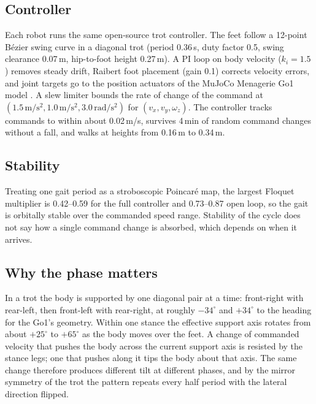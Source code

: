 \documentclass[pdflatex,sn-mathphys-num]{sn-jnl}
\begin{document}
\subsection{Controller}
Each robot runs the same open-source trot controller. The feet follow a 12-point
B\'ezier swing curve \cite{hyun2014cheetah,rahme2020spotmini} in a diagonal trot (period 0.36\,s, duty factor
0.5, swing clearance 0.07\,m, hip-to-foot height 0.27\,m). A PI loop on body velocity ($k_i = 1.5$) removes
steady drift, Raibert foot placement \cite{raibert1986legged} (gain 0.1) corrects velocity errors, and joint
targets go to the position actuators of the MuJoCo Menagerie Go1 model
\cite{todorov2012mujoco,zakka2022menagerie}. A slew limiter bounds the rate of change of the command at
$(1.5\,\mathrm{m/s^2}, 1.0\,\mathrm{m/s^2}, 3.0\,\mathrm{rad/s^2})$ for $(v_x, v_y, \omega_z)$. The
controller tracks commands to within about 0.02\,m/s, survives 4\,min of random command changes without a
fall, and walks at heights from 0.16\,m to 0.34\,m.

\subsection{Stability}
Treating one gait period as a stroboscopic Poincar\'e map, the largest Floquet
multiplier is 0.42--0.59 for the full controller and 0.73--0.87 open loop, so the gait is orbitally stable
over the commanded speed range. Stability of the cycle does not say how a single command change is
absorbed, which depends on when it arrives.

\subsection{Why the phase matters}
In a trot the body is supported by one diagonal pair at a time: front-right
with rear-left, then front-left with rear-right, at roughly $-34^\circ$ and $+34^\circ$ to the heading for the
Go1's geometry. Within one stance the effective support axis rotates from about $+25^\circ$ to $+65^\circ$ as
the body moves over the feet. A change of commanded velocity that pushes the body across the current support
axis is resisted by the stance legs; one that pushes along it tips the body about that axis. The same change
therefore produces different tilt at different phases, and by the mirror symmetry of the trot the pattern
repeats every half period with the lateral direction flipped.
\end{document}

